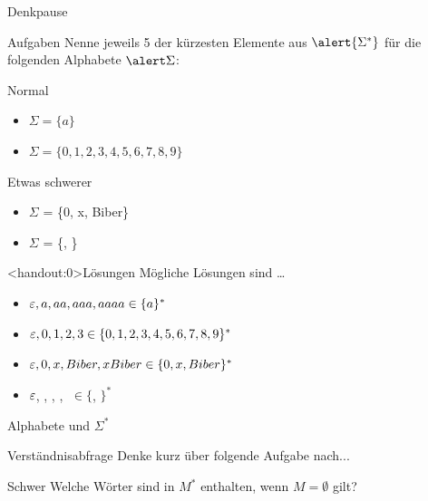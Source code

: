 {
\begin{frame}[fragile]{Denkpause}
    \begin{alertblock}{Aufgaben}
    Nenne jeweils 5 der kürzesten Elemente aus $\alert{\Sigma^{*}}$ für die folgenden Alphabete $\alert\Sigma$:
    \end{alertblock}
    
    \begin{block}{Normal}
        \begin{itemize}
            \item $\Sigma = \{a\}$
            \item $\Sigma = \{0, 1, 2, 3, 4, 5, 6, 7, 8, 9\}$
        \end{itemize}
    \end{block}
    \begin{block}{Etwas schwerer}
        \begin{itemize}
            \item $\Sigma$ = \{0, x, Biber\}
            \item $\Sigma$ = \{\Smiley, \Frowny\}
        \end{itemize}
    \end{block}
\end{frame}
}

{
\begin{frame}<handout:0>{Lösungen}
    Mögliche Lösungen sind \dots
  \begin{itemize}[<+- | alert@+>]
        \item $\varepsilon, a, aa, aaa, aaaa \in \{a\}^{*}$
        \item $\varepsilon, 0, 1, 2, 3\in \{0,1,2,3,4,5,6,7,8,9\}^{*}$
        \item $\varepsilon, 0, x, Biber, xBiber \in \{0, x, Biber\}^{*}$
        \item $\varepsilon$, \Smiley, \Frowny, \Smiley\Smiley, \Smiley\Frowny$\; \in \{$\Smiley, \Frowny$\}^{*}$
    \end{itemize}
\end{frame}
}

\begin{frame}[fragile]{Alphabete und $\Sigma^{*}$}
\begin{alertblock}{Verständnisabfrage}
    Denke kurz über folgende Aufgabe nach...
    \end{alertblock}
    
    \begin{block}{Schwer}
        Welche Wörter sind in $M^{*}$ enthalten, wenn $M = \emptyset$ gilt?
    \end{block}
\end{frame}

